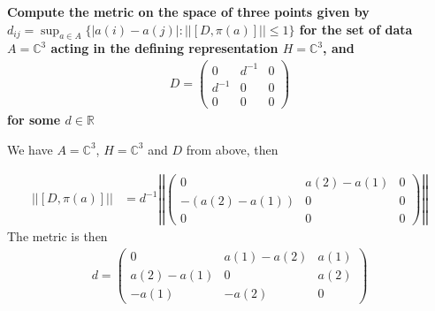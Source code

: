 \documentclass[a4paper]{article}
\newcounter{exercise}
\newenvironment{MyExercise}%
{\begin{mdframed}[style=exercisestyle]}{\end{mdframed}}
\theoremstyle{definition}
\theoremstyle{definition}
\theoremstyle{definition}
\theoremstyle{theorem}
\theoremstyle{theorem}
\begin{document}
\begin{MyExercise}
    \textbf{
	Compute the metric on the space of three points given by $d_{ij} =
	\sup_{a\in A}\{|a(i) - a(j)|: ||[D, \pi(a)]|| \leq 1\}$ for the set of data
    $A = \mathbb{C}^3$ acting in the defining representation $H = \mathbb{C}^3$, and
    \begin{align*}
    D =
    \begin{pmatrix}
        0 & d^{-1} & 0 \\
        d^{-1} & 0 & 0 \\
        0 & 0 & 0
    \end{pmatrix}
    \end{align*}
    for some $d \in \mathbb{R}$
}\newline

    We have $A=\mathbb{C}^3$, $H=\mathbb{C}^3$ and $D$ from above, then

    \begin{align}
        ||[D, \pi(a)]|| &= d^{-1}\left|\left|
    \begin{pmatrix}
        0 & a(2)-a(1) & 0 \\
        -(a(2)-a(1)) & 0 & 0 \\
        0 & 0 & 0
    \end{pmatrix} \right|\right|
    \end{align}
    The metric is then
    \begin{align}
    d =
        \begin{pmatrix}
            0 & a(1)-a(2) & a(1)  \\
            a(2)-a(1) & 0 & a(2) \\
            -a(1) & -a(2) & 0
        \end{pmatrix}
    \end{align}
\end{MyExercise}
\end{document}
